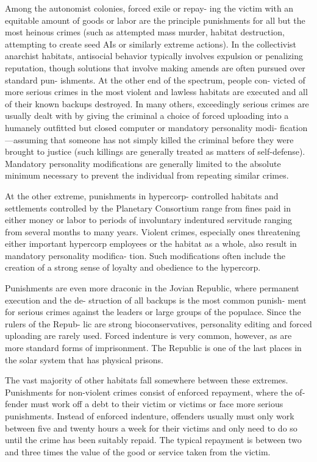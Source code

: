 Among the autonomist colonies, forced exile or repay-
ing the victim with an equitable amount of goods or 
labor are the principle punishments for all but the most 
heinous crimes (such as attempted mass murder, habitat 
destruction, attempting to create seed AIs or similarly 
extreme actions). In the collectivist anarchist habitats, 
antisocial behavior typically involves expulsion or 
penalizing reputation, though solutions that involve 
making amends are often pursued over standard pun-
ishments. At the other end of the spectrum, people con-
victed of more serious crimes in the most violent and 
lawless habitats are executed and all of their known 
backups destroyed. In many others, exceedingly serious 
crimes are usually dealt with by giving the criminal a 
choice of forced uploading into a humanely outfitted 
but closed computer or mandatory personality modi-
fication—assuming that someone has not simply killed 
the criminal before they were brought to justice (such 
killings are generally treated as matters of self-defense). 
Mandatory personality modifications are generally 
limited to the absolute minimum necessary to prevent 
the individual from repeating similar crimes.

At the other extreme, punishments in hypercorp-
controlled habitats and settlements controlled by the 
Planetary Consortium range from fines paid in either 
money or labor to periods of involuntary indentured 
servitude ranging from several months to many years. 
Violent crimes, especially ones threatening either 
important hypercorp employees or the habitat as a 
whole, also result in mandatory personality modifica-
tion. Such modifications often include the creation of a 
strong sense of loyalty and obedience to the hypercorp.

Punishments are even more draconic in the Jovian 
Republic, where permanent execution and the de-
struction of all backups is the most common punish-
ment for serious crimes against the leaders or large 
groups of the populace. Since the rulers of the Repub-
lic are strong bioconservatives, personality editing and 
forced uploading are rarely used. Forced indenture is 
very common, however, as are more standard forms of 
imprisonment. The Republic is one of the last places 
in the solar system that has physical prisons.

The vast majority of other habitats fall somewhere 
between these extremes. Punishments for non-violent 
crimes consist of enforced repayment, where the of-
fender must work off a debt to their victim or victims 
or face more serious punishments. Instead of enforced 
indenture, offenders usually must only work between 
five and twenty hours a week for their victims and 
only need to do so until the crime has been suitably 
repaid. The typical repayment is between two and 
three times the value of the good or service taken 
from the victim.

